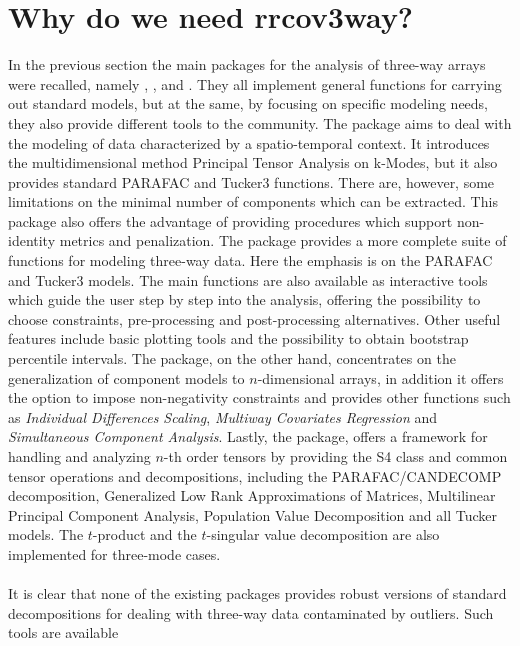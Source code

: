 \documentclass[article,shortnames, nojss]{jss}
\begin{document}
\section{Why do we need rrcov3way?}
\label{sec:why}
In the previous section the main  packages for the analysis of three-way
arrays were recalled, namely , ,  and
. They all implement general functions for carrying out
standard models, but at the same, by focusing on specific modeling
needs, they also provide different tools to the community. The 
package aims to deal with the modeling of data characterized by a
spatio-temporal context. It introduces the multidimensional method
Principal Tensor Analysis on k-Modes, but it also provides standard
PARAFAC and Tucker3 functions. There are, however, some limitations
on the minimal number of components which can be extracted. This package
also offers the advantage of providing procedures which support
non-identity metrics and penalization.
The  package provides a more complete suite of functions
for modeling three-way data. Here the emphasis is on the PARAFAC and
Tucker3 models. The main functions are also available as interactive
tools which guide the user step by step into the analysis, offering
the possibility to choose constraints, pre-processing and post-processing
alternatives. Other useful features include basic plotting tools and
the possibility to obtain bootstrap percentile intervals.
The  package, on the other hand, concentrates on the
generalization of component models to $n$-dimensional arrays, in
addition it offers the option to impose non-negativity constraints
and provides other functions such as \emph{Individual Differences Scaling},
\emph{Multiway Covariates Regression} and \emph{Simultaneous Component Analysis}.
Lastly, the  package, offers a framework for handling
and analyzing $n$-th order tensors by providing the S4 class 
and common tensor operations and decompositions, including the
PARAFAC/CANDECOMP decomposition, Generalized Low Rank Approximations of Matrices,
Multilinear Principal Component Analysis, Population Value Decomposition
and all Tucker models. The $t$-product and the $t$-singular value
decomposition are also implemented for three-mode cases.\\\\
It is clear that none of the existing  packages provides
robust versions of standard decompositions for dealing with
three-way data contaminated by outliers. Such tools are available
\end{document}
